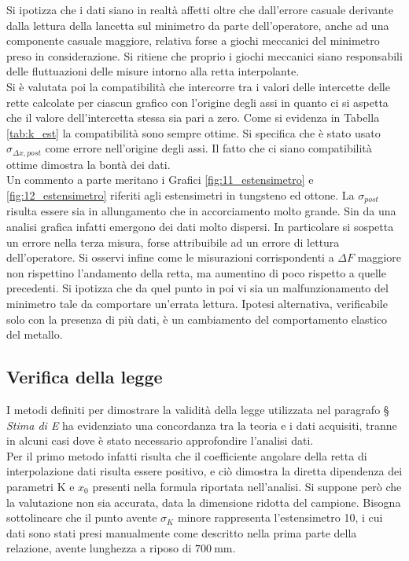 \documentclass[a4paper,11pt,oneside]{article}
\begin{document}
Si ipotizza che i dati siano in realtà affetti oltre che dall'errore casuale derivante dalla lettura della lancetta sul minimetro da parte dell'operatore, anche ad una componente casuale maggiore, relativa forse a giochi meccanici del minimetro preso in considerazione. Si ritiene che proprio i giochi meccanici siano responsabili delle fluttuazioni delle misure intorno alla retta interpolante.\\
Si è valutata poi la compatibilità che intercorre tra i valori delle intercette delle rette calcolate per ciascun grafico con l'origine degli assi in quanto ci si aspetta che il valore dell'intercetta stessa sia pari a zero. Come si evidenza in Tabella \ref{tab:k_est} la compatibilità sono sempre ottime. Si specifica che è stato usato $\sigma_{\Delta x, post}$ come errore nell'origine degli assi. Il fatto che ci siano compatibilità ottime dimostra la bontà dei dati.\\
Un commento a parte meritano i Grafici \ref{fig:11_estensimetro} e \ref{fig:12_estensimetro} riferiti agli estensimetri in tungsteno ed ottone. La $\sigma_{post}$ risulta essere sia in allungamento che in accorciamento molto grande. Sin da una analisi grafica infatti emergono dei dati molto dispersi. In particolare si sospetta un errore nella terza misura, forse attribuibile ad un errore di lettura dell'operatore. Si osservi infine come le misurazioni corrispondenti a $\Delta F$ maggiore non rispettino l'andamento della retta, ma aumentino di poco rispetto a quelle precedenti. Si ipotizza che da quel punto in poi vi sia un malfunzionamento del minimetro tale da comportare un'errata lettura. Ipotesi alternativa, verificabile solo con la presenza di più dati, è un cambiamento del comportamento elastico del metallo. 


\subsection{Verifica della legge}
I metodi definiti per dimostrare la validità della legge utilizzata nel paragrafo \S \textit{ Stima di E} ha evidenziato una concordanza tra la teoria e i dati acquisiti, tranne in alcuni casi dove è stato necessario approfondire l'analisi dati.\\
Per il primo metodo infatti risulta che il coefficiente angolare della retta di interpolazione dati risulta essere positivo, e ciò dimostra la diretta dipendenza dei parametri K e $x_0$ presenti nella formula riportata nell'analisi. Si suppone però che la valutazione non sia accurata, data la dimensione ridotta del campione.
Bisogna sottolineare che il punto avente $\sigma_K$ minore rappresenta l'estensimetro 10, i cui dati sono stati presi manualmente come descritto nella prima parte della relazione, avente lunghezza a riposo di $\SI{700}{\milli\meter}$.\\
\end{document}
